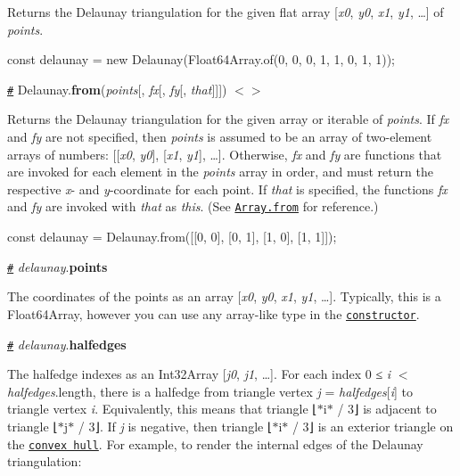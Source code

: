 Returns the Delaunay triangulation for the given flat array \mbox{[}{\itshape x0}, {\itshape y0}, {\itshape x1}, {\itshape y1}, …\mbox{]} of {\itshape points}.


\begin{DoxyCode}
const delaunay = new Delaunay(Float64Array.of(0, 0, 0, 1, 1, 0, 1, 1));
\end{DoxyCode}


\href{#delaunay_from}{\tt \#} Delaunay.{\bfseries from}({\itshape points}\mbox{[}, {\itshape fx}\mbox{[}, {\itshape fy}\mbox{[}, {\itshape that}\mbox{]}\mbox{]}\mbox{]}) \href{https://github.com/d3/d3-delaunay/blob/master/src/delaunay.js}{\tt $<$$>$}

Returns the Delaunay triangulation for the given array or iterable of {\itshape points}. If {\itshape fx} and {\itshape fy} are not specified, then {\itshape points} is assumed to be an array of two-\/element arrays of numbers\+: \mbox{[}\mbox{[}{\itshape x0}, {\itshape y0}\mbox{]}, \mbox{[}{\itshape x1}, {\itshape y1}\mbox{]}, …\mbox{]}. Otherwise, {\itshape fx} and {\itshape fy} are functions that are invoked for each element in the {\itshape points} array in order, and must return the respective {\itshape x}-\/ and {\itshape y}-\/coordinate for each point. If {\itshape that} is specified, the functions {\itshape fx} and {\itshape fy} are invoked with {\itshape that} as {\itshape this}. (See \href{https://developer.mozilla.org/docs/Web/JavaScript/Reference/Global_Objects/Array/from}{\tt Array.\+from} for reference.)


\begin{DoxyCode}
const delaunay = Delaunay.from([[0, 0], [0, 1], [1, 0], [1, 1]]);
\end{DoxyCode}


\href{#delaunay_points}{\tt \#} {\itshape delaunay}.{\bfseries points}

The coordinates of the points as an array \mbox{[}{\itshape x0}, {\itshape y0}, {\itshape x1}, {\itshape y1}, …\mbox{]}. Typically, this is a Float64\+Array, however you can use any array-\/like type in the \href{#new_Delaunay}{\tt constructor}.

\href{#delaunay_halfedges}{\tt \#} {\itshape delaunay}.{\bfseries halfedges}

The halfedge indexes as an Int32\+Array \mbox{[}{\itshape j0}, {\itshape j1}, …\mbox{]}. For each index 0 ≤ {\itshape i} $<$ {\itshape halfedges}.length, there is a halfedge from triangle vertex {\itshape j} = {\itshape halfedges}\mbox{[}{\itshape i}\mbox{]} to triangle vertex {\itshape i}. Equivalently, this means that triangle ⌊$\ast$i$\ast$ / 3⌋ is adjacent to triangle ⌊$\ast$j$\ast$ / 3⌋. If {\itshape j} is negative, then triangle ⌊$\ast$i$\ast$ / 3⌋ is an exterior triangle on the \href{#delaunay_hull}{\tt convex hull}. For example, to render the internal edges of the Delaunay triangulation\+:


